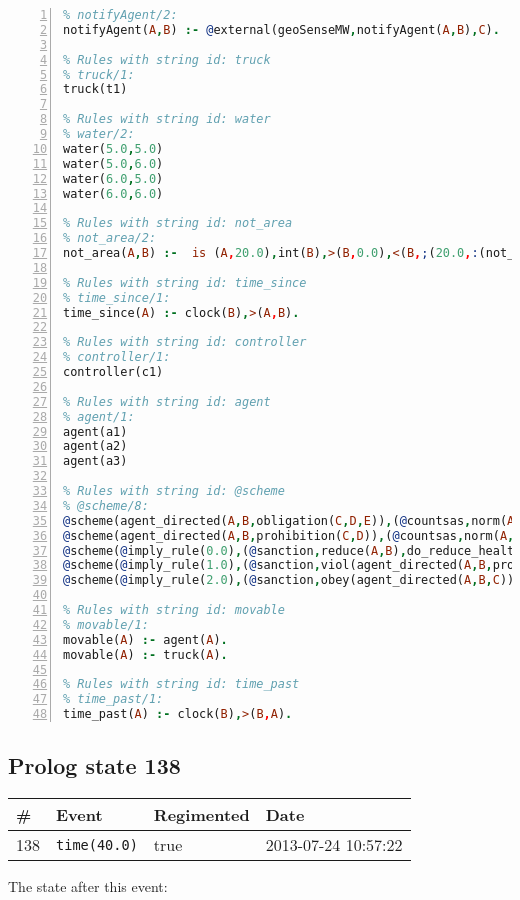 \documentclass[11pt]{article}\usepackage[utf8]{inputenc}\usepackage{geometry}
\begin{document}
\begin{lstlisting}[language=Prolog, numbers=left]
% Rules with string id: notifyAgent
% notifyAgent/2:
notifyAgent(A,B) :- @external(geoSenseMW,notifyAgent(A,B),C).

% Rules with string id: truck
% truck/1:
truck(t1)

% Rules with string id: water
% water/2:
water(5.0,5.0)
water(5.0,6.0)
water(6.0,5.0)
water(6.0,6.0)

% Rules with string id: not_area
% not_area/2:
not_area(A,B) :-  is (A,20.0),int(B),>(B,0.0),<(B,;(20.0,:(not_area(A,B), is (-(B),20.0)))),int(A),>(A,0.0),<(A,;(20.0,:(area(A,B),-(int(A))))),int(B),>(A,0.0),>(B,0.0),<(A,21.0),<(B,21.0).

% Rules with string id: time_since
% time_since/1:
time_since(A) :- clock(B),>(A,B).

% Rules with string id: controller
% controller/1:
controller(c1)

% Rules with string id: agent
% agent/1:
agent(a1)
agent(a2)
agent(a3)

% Rules with string id: @scheme
% @scheme/8:
@scheme(agent_directed(A,B,obligation(C,D,E)),(@countsas,norm(A,B,F,obligation(C,D,E)),F),false,(listTrue(C)),(time_past(D)),false,[plus(viol(agent_directed(A,B,obligation(C,D,E))))|[]],[plus(obey(agent_directed(A,B,obligation(C,D,E))))|[]])
@scheme(agent_directed(A,B,prohibition(C,D)),(@countsas,norm(A,B,E,prohibition(C,D)),E),(listTrue(C)),false,(false),false,[plus(viol(agent_directed(A,B,prohibition(C,D))))|[]],[plus(obey(agent_directed(A,B,prohibition(C,D))))|[]])
@scheme(@imply_rule(0.0),(@sanction,reduce(A,B),do_reduce_health(A,B),notifyAgent(A,changed(status))),true,false,false,false,[min(reduce(A,B))|[]],[])
@scheme(@imply_rule(1.0),(@sanction,viol(agent_directed(A,B,prohibition(C,D))),do_sanction(D)),true,false,false,false,[min(viol(agent_directed(A,B,prohibition(C,D))))|[]],[])
@scheme(@imply_rule(2.0),(@sanction,obey(agent_directed(A,B,C))),true,false,false,false,[min(obey(agent_directed(A,B,C)))|[]],[])

% Rules with string id: movable
% movable/1:
movable(A) :- agent(A).
movable(A) :- truck(A).

% Rules with string id: time_past
% time_past/1:
time_past(A) :- clock(B),>(B,A).

\end{lstlisting}
\clearpage 
\subsection{Prolog state 138}
\begin{table}[ht]
\centering 
\begin{tabular}{l l l l} 
\textbf{\#} & \textbf{Event} & \textbf{Regimented} & \textbf{Date} \\ [0.5ex] 
\hline
138&\texttt{time(40.0)}&true&2013-07-24 10:57:22\\ [1ex] \hline\end{tabular}
\end{table}
The state after this event:
\end{document}
